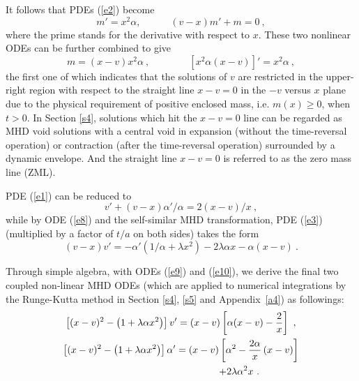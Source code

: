 \documentclass[fleqn,usenatbib]{mnras}
\begin{document}
It follows that PDEs (\ref{e2}) become
\begin{equation}
m'=x^{2}\alpha, \qquad\quad (v-x)m'+m=0\ ,\label{e7}
\end{equation}
where the prime stands for the derivative with respect to $x$.
These two nonlinear ODEs can be further combined to give
\begin{equation}
m=(x-v)x^{2}\alpha\ , \qquad\qquad
 \left[x^{2}\alpha(x-v)\right]'=x^{2}\alpha\ ,\label{e8}
\end{equation}
the first one of which indicates that the solutions of $v$ are restricted in the upper-right region with respect to the straight line $x-v=0$ in the $-v$ versus $x$ plane due to the physical requirement of positive enclosed mass, i.e. $m(x)\geq 0$, when $t>0$. In Section \ref{s4}, solutions which hit the $x-v=0$ line can be regarded as MHD void solutions with a central void in expansion (without the time-reversal operation) or contraction (after the time-reversal operation) surrounded by a dynamic envelope. And the straight line $x-v=0$ is referred to as the zero mass line (ZML).

PDE (\ref{e1}) can be reduced to
\begin{equation}
v'+(v-x)\alpha'/\alpha=2(x-v)/x\ ,\label{e9}
\end{equation}
while by ODE (\ref{e8}) and the self-similar MHD transformation, PDE (\ref{e3}) (multiplied by a factor of $t/a$ on both sides) takes the form 
\begin{equation}
(v-x)v'=-\alpha'\left(1/\alpha+\lambda x^{2}\right)-2\lambda\alpha x-\alpha (x-v)\ .\label{e10}
\end{equation}

Through simple algebra, with ODEs (\ref{e9}) and (\ref{e10}), we derive the final two coupled non-linear MHD ODEs (which are applied to numerical integrations by the Runge-Kutta method in Section \ref{s4}, \ref{s5} and Appendix~\ref{a4}) as followings:
\begin{gather}
\left[(x-v)^{2}-\left(1+\lambda\alpha x^{2}\right)\right]v'=(x-v)
 \left[\alpha (x-v)-\frac{2}{x}\right]\ ,\label{e11}\\
\left[(x-v)^{2}-\left(1+\lambda\alpha x^{2}\right)\right]\alpha'=(x-v)\left[\alpha^{2}-\frac{2\alpha}{x}
 \left(x-v\right)\right]\notag\\
\quad\quad\quad\quad\quad\quad\quad\quad\quad\quad\quad\quad +2\lambda\alpha^{2}x\ .\label{e12}
\end{gather}
\end{document}
